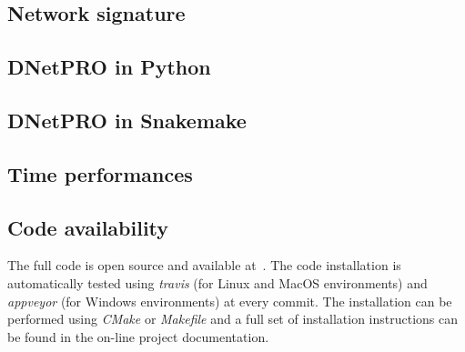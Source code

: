 \documentclass{standalone}
\begin{document}
\subsection[Network Signature]{Network signature}\label{implementation:network}

\subsection[Python wrap]{DNetPRO in Python}\label{implementation:python}

\subsection[Pipeline]{DNetPRO in Snakemake}\label{implementation:snakemake}

\subsection[Time performances]{Time performances}\label{implementation:timing}

\subsection[Code availability]{Code availability}\label{implementation:repo}

The full code is open source and available at~\cite{DNetPRO}.
The code installation is automatically tested using \emph{travis} (for Linux and MacOS environments) and \emph{appveyor} (for Windows environments) at every commit.
The installation can be performed using \emph{CMake} or \emph{Makefile} and a full set of installation instructions can be found in the on-line project documentation.

\end{document}
